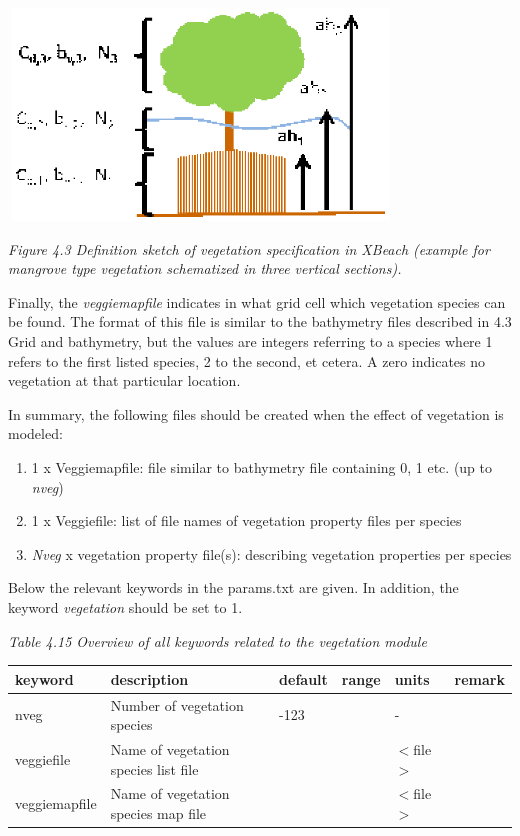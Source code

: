 \documentclass{article}
\begin{document}
\noindent \includegraphics*[width=4.01in, height=2.22in, keepaspectratio=false]{image26}

\noindent \textit{Figure 4.3 Definition sketch of vegetation specification in XBeach (example for mangrove type vegetation schematized in three vertical sections).}

\noindent 

\noindent Finally,  the \textit{veggiemapfile} indicates in what grid cell which vegetation species can be found. The format of this file is similar to the bathymetry files described in 4.3 Grid and bathymetry, but the values are integers referring to a species where 1 refers to the first listed species, 2 to the second, et cetera. A zero indicates no vegetation at that particular location.

\noindent In summary, the following files should be created when the effect of vegetation is modeled:

\begin{enumerate}
\item  1 x Veggiemapfile: file similar to bathymetry file containing 0, 1 etc. (up to \textit{nveg})

\item  1 x Veggiefile: list of file names of vegetation property files per species

\item  \textit{Nveg }x vegetation property file(s): describing vegetation properties per species
\end{enumerate}

\noindent 

\noindent Below the relevant keywords in the params.txt are given. In addition, the keyword \textit{vegetation} should be set to 1.

\noindent \textit{Table 4.15 Overview of all keywords related to the vegetation module}

\begin{tabular}{|p{0.8in}|p{1.0in}|p{0.6in}|p{0.6in}|p{0.5in}|p{0.6in}|} \hline 
keyword & description & default & range & units & remark \\ \hline 
nveg & Number of vegetation species & -123 &  & - &  \\ \hline 
veggiefile & Name of vegetation species list file &  &  & $<$file$>$ &  \\ \hline 
veggiemapfile & Name of vegetation species map file &  &  & $<$file$>$ &  \\ \hline 
\end{tabular}
\end{document}
